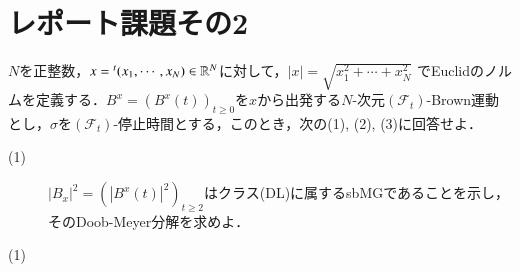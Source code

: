\section{レポート課題その2}
$N$を正整数，$x = {}^t(x_1,\cdots,x_N) \in \mathbb{R}^N$に対して，$|x| = \sqrt{x_1^2 + \cdots + x_N^2}$
でEuclidのノルムを定義する．$B^x = \left(B^x(t)\right)_{t \geq 0}$を$x$から出発する$N$-次元$(\mathcal{F}_t)$-Brown運動
とし，$\sigma$を$(\mathcal{F}_t)$-停止時間とする，このとき，次の(1), (2), (3)に回答せよ．
\begin{description}
\item[(1)] $|B_x|^2 = \left(\left|B^x(t)\right|^2\right)_{t \geq 2}$はクラス(DL)に属するsbMGであることを示し，
	そのDoob-Meyer分解を求めよ．
\end{description}

\begin{prf}
	\item[(1)] 
\end{prf}